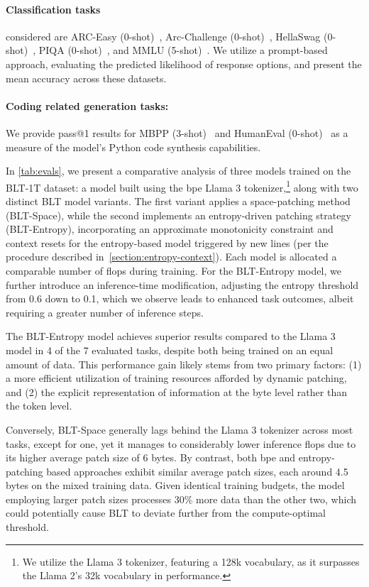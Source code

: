 \paragraph{Classification tasks} considered are ARC-Easy (0-shot)~\citep{Eval_ARC}, Arc-Challenge (0-shot)~\citep{Eval_ARC}, HellaSwag (0-shot)~\citep{Eval_hellaswag}, PIQA (0-shot)~\citep{Eval_piqa}, and MMLU (5-shot)~\citep{hendrycks2020measuring}. We utilize a prompt-based approach, evaluating the predicted likelihood of response options, and present the mean accuracy across these datasets.
\paragraph{Coding related generation tasks:} We provide pass@1 results for MBPP (3-shot)~\citep{Eval_MBPP} and HumanEval (0-shot)~\citep{Eval_HumanEval} as a measure of the model’s Python code synthesis capabilities.

In \autoref{tab:evals}, we present a comparative analysis of three models trained on the {\textsc BLT}-1T dataset: a model built using the bpe Llama 3 tokenizer,\footnote{We utilize the Llama 3 tokenizer, featuring a 128k vocabulary, as it surpasses the Llama 2’s 32k vocabulary in performance.} along with two distinct {\textsc BLT} model variants. The first variant applies a space-patching method ({\textsc BLT}-Space), while the second implements an entropy-driven patching strategy ({\textsc BLT}-Entropy), incorporating an approximate monotonicity constraint and context resets for the entropy-based model triggered by new lines (per the procedure described in~\autoref{section:entropy-context}). Each model is allocated a comparable number of flops during training. For the {\textsc BLT}-Entropy model, we further introduce an inference-time modification, adjusting the entropy threshold from 0.6 down to 0.1, which we observe leads to enhanced task outcomes, albeit requiring a greater number of inference steps.

The {\textsc BLT}-Entropy model achieves superior results compared to the Llama 3 model in 4 of the 7 evaluated tasks, despite both being trained on an equal amount of data. This performance gain likely stems from two primary factors: (1) a more efficient utilization of training resources afforded by dynamic patching, and (2) the explicit representation of information at the byte level rather than the token level.

Conversely, {\textsc BLT}-Space generally lags behind the Llama 3 tokenizer across most tasks, except for one, yet it manages to considerably lower inference flops due to its higher average patch size of 6 bytes. By contrast, both bpe and entropy-patching based approaches exhibit similar average patch sizes, each around 4.5 bytes on the mixed training data. Given identical training budgets, the model employing larger patch sizes processes 30\% more data than the other two, which could potentially cause {\textsc BLT} to deviate further from the compute-optimal threshold.

